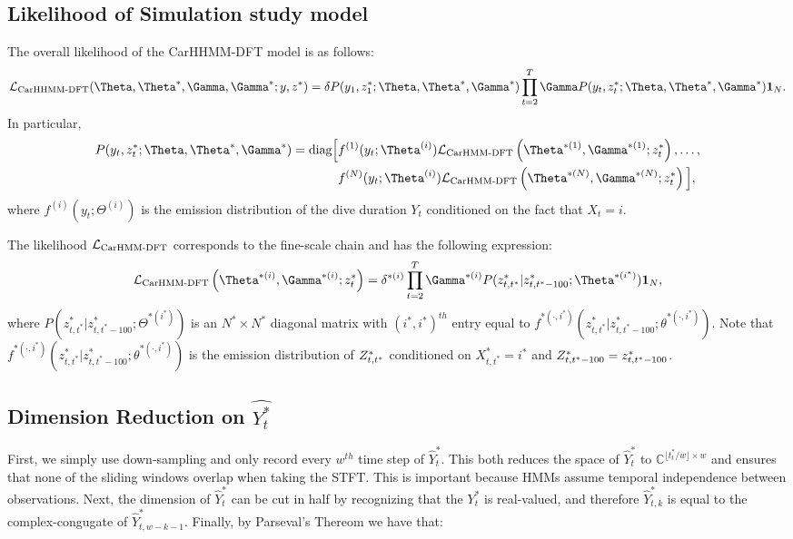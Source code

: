 \subsection{Likelihood of Simulation study model}

The overall likelihood of the CarHHMM-DFT model is as follows:
%
$$\calL_{\text{CarHHMM-DFT}}(\Theta,\Theta^*,\Gamma,\Gamma^*;y,z^*) = \delta P(y_1,z_1^*;\Theta,\Theta^*,\Gamma^*) \prod_{t=2}^T \Gamma P(y_t,z_t^*;\Theta,\Theta^*,\Gamma^*) \mathbf{1}_N.$$
%
In particular,
%
\begin{align*}
P(y_t,z_t^*;\Theta,\Theta^*,\Gamma^*)  = \text{diag}\Big[&f^{(1)}(y_t;\Theta^{(i)})\calL_{\text{CarHMM-DFT}}\left(\Theta^{*(1)},\Gamma^{*(1)};z_t^*\right), \ldots , \\
&f^{(N)}(y_t;\Theta^{(i)})\calL_{\text{CarHMM-DFT}}\left(\Theta^{*(N)},\Gamma^{*(N)};z_t^*\right) \Big],
\end{align*}
%
where $f^{(i)}(y_t;\Theta^{(i)})$ is the emission distribution of the dive duration $Y_t$ conditioned on the fact that $X_t = i$.

The likelihood $\mathcal{L}_{\text{CarHMM-DFT}}$ corresponds to the fine-scale chain and has the following expression:
%
$$\calL_{\text{CarHMM-DFT}}\left(\Theta^{*(i)},\Gamma^{*(i)};z_t^*\right) = \delta^{*(i)} \prod_{t=2}^T \Gamma^{*(i)} P(z^*_{t,t^*}|z^*_{t,t^*-100};\Theta^{*(i^*)}) \mathbf{1}_N,$$
%
where $P(z^*_{t,t^*}|z^*_{t,t^*-100};\Theta^{*(i^*)})$ is an $N^* \times N^*$ diagonal matrix with $(i^*,i^*)^{th}$ entry equal to $f^{*(\cdot,i^*)}(z^*_{t,t^*}|z^*_{t,t^*-100}; \theta^{*(\cdot,i^*)})$.
%
Note that $f^{*(\cdot,i^*)}(z^*_{t,t^*}|z^*_{t,t^*-100}; \theta^{*(\cdot,i^*)})$ is the emission distribution of $Z^*_{t,t^*}$ conditioned on $X^*_{t,t^*} = i^*$ and $Z^*_{t,t^*-100} = z^*_{t,t^*-100}$.


\iffalse


\subsection{Dimension Reduction on $\hat{Y_t^*}$}

First, we simply use down-sampling and only record every $w^{th}$ time step of $\hat{Y}_t^*$. This both reduces the space of $\hat{Y}_t^*$ to $\mathbb{C}^{\lfloor t^*_t / w \rfloor \times w}$ and ensures that none of the sliding windows overlap when taking the STFT. This is important because HMMs assume temporal independence between observations. Next, the dimension of $\hat{Y}_t^*$ can be cut in half by recognizing that the $Y_t^*$ is real-valued, and therefore $\hat{Y}_{t,k}^*$ is equal to the complex-congugate of $\hat{Y}_{t,w-k-1}^*$. Finally, by Parseval's Thereom we have that:

